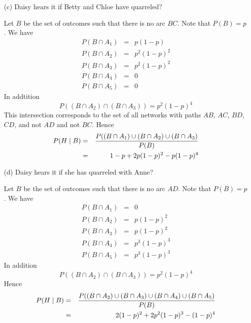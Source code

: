 \bigskip
\noindent
(c) Daisy hears it if Betty and Chloe have quarreled?

\bigskip
\noindent
Let $B$ be the set of outcomes such that there is no arc $BC$.
Note that $P(B)=p$.
We have
\begin{eqnarray*}
P(B\cap A_1)&=&p(1-p) \\
P(B\cap A_2)&=&p^2(1-p)^2 \\
P(B\cap A_3)&=&p^2(1-p)^2 \\
P(B\cap A_4)&=&0 \\
P(B\cap A_5)&=&0
\end{eqnarray*}
In addtition
$$P((B\cap A_2)\cap(B\cap A_3))=p^2(1-p)^4$$
This intersection corresponds to the set of all networks with paths
$AB$, $AC$, $BD$, $CD$, and not $AD$ and not $BC$.
Hence
\begin{eqnarray*}
P(H\mid B)&=&{P(
(B\cap A_1)\cup
(B\cap A_2)\cup
(B\cap A_3)
\over P(B)} \\
&=&1-p+2p(1-p)^2-p(1-p)^4
\end{eqnarray*}

\bigskip
\noindent
(d) Daisy hears it if she has quarreled with Anne?

\bigskip
\noindent
Let $B$ be the set of outcomes such that there is no arc $AD$.
Note that $P(B)=p$.
We have
\begin{eqnarray*}
P(B\cap A_1)&=&0 \\
P(B\cap A_2)&=&p(1-p)^2 \\
P(B\cap A_3)&=&p(1-p)^2 \\
P(B\cap A_4)&=&p^3(1-p)^3 \\
P(B\cap A_5)&=&p^3(1-p)^3
\end{eqnarray*}
In addition
$$P((B\cap A_2)\cap(B\cap A_3))=p^2(1-p)^4$$
Hence
\begin{eqnarray*}
P(H\mid B)&=&{P(
(B\cap A_2)\cup
(B\cap A_3)\cup
(B\cap A_4)\cup
(B\cap A_5)
\over P(B)} \\
&=&2(1-p)^2+2p^2(1-p)^3-(1-p)^4
\end{eqnarray*}

